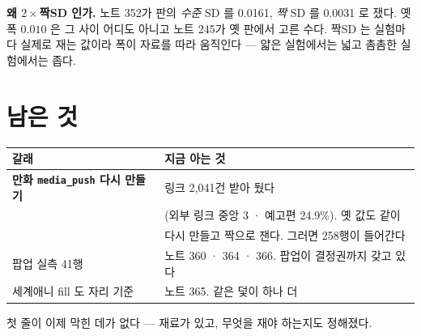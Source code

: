 \documentclass[11pt]{article}
\begin{document}
\textbf{왜 $2\times$짝SD 인가.} 노트 352가 판의 \emph{수준} SD 를 0.0161,
\emph{짝} SD 를 0.0031 로 쟀다. 옛 폭 $0.010$ 은 그 사이 어디도 아니고
노트 245가 옛 판에서 고른 수다. 짝SD 는 실험마다 실제로 재는 값이라
폭이 자료를 따라 움직인다 --- 얇은 실험에서는 넓고 촘촘한 실험에서는
좁다.

\section{남은 것}

\begin{center}
\begin{tabular}{ll}
\hline
갈래 & 지금 아는 것 \\
\hline
\textbf{만화 \texttt{media\_push} 다시 만들기} & 링크 2,041건 받아 뒀다 \\
 & (외부 링크 중앙 3 · 예고편 24.9\%). 옛 값도 같이 \\
 & 다시 만들고 짝으로 잰다. 그러면 258행이 들어간다 \\
팝업 실측 41행 & 노트 360 · 364 · 366. 팝업이 결정권까지 갖고 있다 \\
세계애니 fill 도 자리 기준 & 노트 365. 같은 덫이 하나 더 \\
\hline
\end{tabular}
\end{center}

첫 줄이 이제 막힌 데가 없다 --- 재료가 있고, 무엇을 재야 하는지도 정해졌다.
\end{document}
